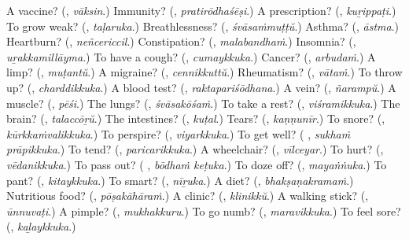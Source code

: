\begin{tcolorbox}[breakable,colback=teal!4,colframe=teal!35!black,title={Before you move on}]
A vaccine? (\textbf{}, \emph{vāksin}.) Immunity? (\textbf{}, \emph{pratirōdhaśēṣi}.) A prescription? (\textbf{}, \emph{kuṟippaṭi}.) To grow weak? (\textbf{}, \emph{taḷaruka}.) Breathlessness? (\textbf{}, \emph{śvāsaṁmuṭṭŭ}.) Asthma? (\textbf{}, \emph{āstma}.) Heartburn? (\textbf{}, \emph{neñcericcil}.) Constipation? (\textbf{}, \emph{malabandhaṁ}.) Insomnia? (\textbf{}, \emph{uṟakkamillāyma}.) To have a cough? (\textbf{}, \emph{cumaykkuka}.) Cancer? (\textbf{}, \emph{arbudaṁ}.) A limp? (\textbf{}, \emph{muṭantŭ}.) A migraine? (\textbf{}, \emph{cennikkuttŭ}.) Rheumatism? (\textbf{}, \emph{vātaṁ}.) To throw up? (\textbf{}, \emph{charddikkuka}.) A blood test? (\textbf{}, \emph{raktapariśōdhana}.) A vein? (\textbf{}, \emph{ñarampŭ}.) A muscle? (\textbf{}, \emph{pēśi}.) The lungs? (\textbf{}, \emph{śvāsakōśaṁ}.) To take a rest? (\textbf{}, \emph{viśramikkuka}.) The brain? (\textbf{}, \emph{talaccōṟŭ}.) The intestines? (\textbf{}, \emph{kuṭal}.) Tears? (\textbf{}, \emph{kaṇṇunīr}.) To snore? (\textbf{}, \emph{kūrkkaṁvalikkuka}.) To perspire? (\textbf{}, \emph{viyarkkuka}.) To get well? (\textbf{ }, \emph{sukhaṁ prāpikkuka}.) To tend? (\textbf{}, \emph{paricarikkuka}.) A wheelchair? (\textbf{}, \emph{vīlceyar}.) To hurt? (\textbf{}, \emph{vēdanikkuka}.) To pass out? (\textbf{ }, \emph{bōdhaṁ keṭuka}.) To doze off? (\textbf{}, \emph{mayaṅṅuka}.) To pant? (\textbf{}, \emph{kitaykkuka}.) To smart? (\textbf{}, \emph{nīṟuka}.) A diet? (\textbf{}, \emph{bhakṣaṇakramaṁ}.) Nutritious food? (\textbf{}, \emph{pōṣakāhāraṁ}.) A clinic? (\textbf{}, \emph{klinikkŭ}.) A walking stick? (\textbf{}, \emph{ūnnuvaṭi}.) A pimple? (\textbf{}, \emph{mukhakkuru}.) To go numb? (\textbf{}, \emph{maravikkuka}.) To feel sore? (\textbf{}, \emph{kaḻaykkuka}.)
\end{tcolorbox}
